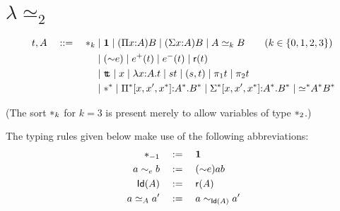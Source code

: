 \documentclass[12pt]{article}
\newcommand{\leqg}{{\lambda{\simeq}_2}}
\newcommand{\unitt}{{\boldsymbol{1}}}
\newcommand{\idof}[1]{\mathsf{Id}{(#1)}}
\begin{document}
\pagestyle{empty}
\thispagestyle{empty}
\section*{$\leqg$}
\begin{align*}
  t, A \quad ::= \quad \sta_k
&\mid \unitt \mid (\Pi x {:} A) B \mid (\Sigma x {:} A) B \mid A \eeq_k B  \qquad (k \in \setof{0,1,2,3}) \\
&\mid ({\sim}e) \mid e^+(t) \mid e^-(t) \mid \refl{t}\\
&\mid \ttt \mid x \mid \lambda x {:}A.t \mid s t \mid (s,t) \mid \pi_1 t \mid \pi_2 t \\
&\mid \sta^{\sta} \mid \Pi^* [x,x',x^*] {:} A^*. B^*
\mid \Sigma^* [x,x',x^*] {:} A^*. B^*
\mid {\ee{}^*} A^* B^*\\
\end{align*}

(The sort $\sta_k$ for $k=3$ is present merely to allow variables of type $\sta_2$.)

The typing rules given below make use of the following abbreviations:
\begin{align*}
\sta_{-1} &\df \unitt \\
a \sim_e b &\df ({\sim} e) a b\\
\idof{A} &\df \refl{A}\\
a \ee A a' &\df a \sim_{\idof{A}} a'
\end{align*}

\begin{prooftree}
\end{prooftree}
\begin{prooftree}
  \end{prooftree}
  \begin{prooftree}
\end{prooftree}
\begin{prooftree}
\end{prooftree}

\begin{prooftree}
\end{prooftree}
\begin{prooftree}
\end{prooftree}
\begin{prooftree}
\end{prooftree}
\end{document}
